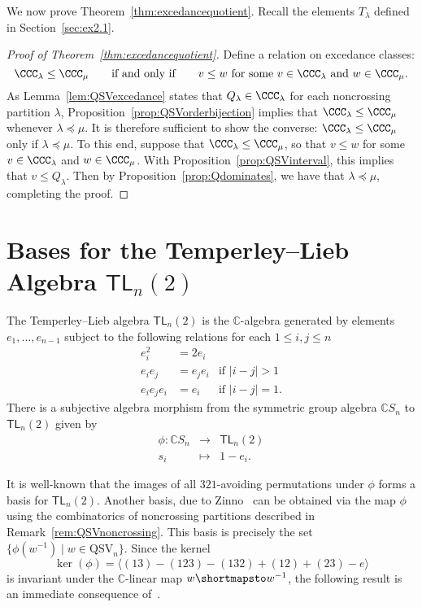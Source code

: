 \documentclass[12pt]{article}
\theoremstyle{definition}
\theoremstyle{remark}
\numberwithin{equation}{section}
\newcommand{\CC}{\mathbb{C}}
\renewcommand{\to}{\longrightarrow}
\renewcommand{\mapsto}{\longmapsto}
\newcommand{\TL}{\mathsf{TL}}
\newcommand{\QSV}{\mathrm{QSV}}
\begin{document}
We now prove Theorem~\ref{thm:excedancequotient}.  Recall the elements $T_{\lambda}$ defined in Section~\ref{sec:ex2.1}.

\begin{proof}[Proof of Theorem~\ref{thm:excedancequotient}]
Define a relation on excedance classes:
\[
\CCC_{\lambda} \le \CCC_{\mu}
\qquad\text{if and only if}\qquad
\text{$v \le w$ for some $v \in \CCC_{\lambda}$ and $w \in \CCC_{\mu}$}.
\]
As Lemma~\ref{lem:QSVexcedance} states that $Q_{\lambda} \in \CCC_{\lambda}$ for each noncrossing partition $\lambda$, Proposition~\ref{prop:QSVorderbijection} implies that $\CCC_{\lambda} \le \CCC_{\mu}$ whenever $\lambda \preceq \mu$.  It is therefore sufficient to show the converse: $\CCC_{\lambda} \le \CCC_{\mu}$ only if $\lambda \preceq \mu$.  To this end, suppose that $\CCC_{\lambda} \le \CCC_{\mu}$, so that $v \le w$ for some $v \in \CCC_{\lambda}$ and $w \in \CCC_{\mu}$.  With Proposition~\ref{prop:QSVinterval}, this implies that $v \le Q_{\lambda}$.  Then by Proposition~\ref{prop:Qdominates}, we have that $\lambda \preceq \mu$, completing the proof.
\end{proof}


\section{Bases for the Temperley--Lieb Algebra $\TL_{n}(2)$}

The Temperley--Lieb algebra $\TL_{n}(2)$ is the $\CC$-algebra generated by elements $e_{1}, \ldots, e_{n-1}$ subject to the following relations for each $1 \le i, j \le n$
\[
\begin{array}{rll}
e_{i}^{2} &= 2 e_{i} \\
e_{i}e_{j} &= e_{j}e_{i} & \text{if $|i - j| > 1$} \\
e_{i} e_{j} e_{i} &= e_{i} & \text{if $|i - j| = 1$}.
\end{array}
\]
There is a subjective algebra morphism from the symmetric group algebra $\CC S_{n}$ to $\TL_{n}(2)$ given by 
\[
\begin{array}{rcl}
\phi: \CC S_{n} & \to & \TL_{n}(2) \\
s_{i} & \mapsto & 1 - e_{i}.
\end{array}
\]

It is well-known that the images of all $321$-avoiding permutations under $\phi$ forms a basis for $\TL_{n}(2)$.  
Another basis, due to Zinno~\cite{Zinno} can be obtained via the map $\phi$ using the combinatorics of noncrossing partitions described in Remark~\ref{rem:QSVnoncrossing}.  This basis is precisely the set $\{\phi(w^{-1}) \;|\; w \in \QSV_{n}\}$.  Since the kernel
\[
\ker(\phi) = \langle (13) - (123) - (132) + (12) + (23) - e \rangle
\]
is invariant under the $\CC$-linear map $w \shortmapsto w^{-1}$, the following result is an immediate consequence of~\cite[Theorem 2]{Zinno}.
\end{document}
